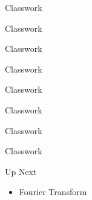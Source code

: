 \documentclass[aspectratio=169,xcolor=dvipsnames,svgnames,x11names,fleqn]{beamer}
\begin{document}
\begin{frame}{Classwork}
    
\end{frame}
\begin{frame}{Classwork}
    
\end{frame}
\begin{frame}{Classwork}
    
\end{frame}
\begin{frame}{Classwork}
    
\end{frame}
\begin{frame}{Classwork}
    
\end{frame}
\begin{frame}{Classwork}
    
\end{frame}
\begin{frame}{Classwork}
    
\end{frame}
\begin{frame}{Classwork}
    
\end{frame}

\begin{frame}{Up Next}
\begin{itemize}
	\item Fourier Transform
\end{itemize}
    
\end{frame}
\end{document}
